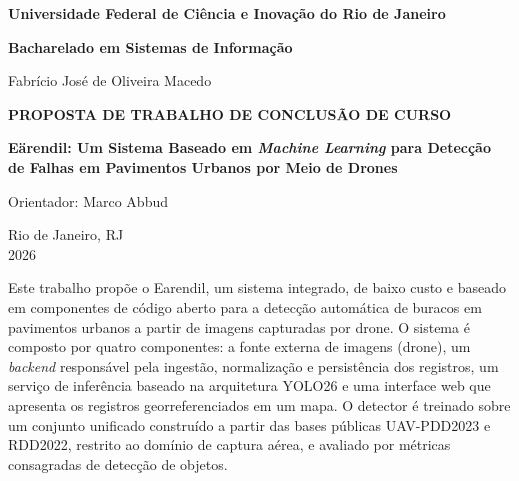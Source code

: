 \documentclass[12pt]{article}
\title{\titulotrabalho}
\author{Fabrício José\inst{1}}
\newcommand{\titulotrabalho}{Eärendil: Um Sistema Baseado em
\emph{Machine Learning} para Detecção de Falhas em Pavimentos Urbanos por
Meio de Drones}
\begin{document}
\begin{titlepage}
  \centering
  \vspace*{0.5cm}
  {\large\bfseries Universidade Federal de Ciência e Inovação do Rio de
    Janeiro\par}
  \vspace{0.3cm}
  {\large \textbf{Bacharelado em Sistemas de Informação}\par}
  \vfill
  {\large Fabrício José de Oliveira Macedo\par}
  \vfill
  {\large\bfseries PROPOSTA DE TRABALHO DE CONCLUSÃO DE CURSO\par}
  \vspace{1.2cm}
  {\Large\bfseries \titulotrabalho\par}
  \vfill
  \hfill\begin{minipage}{0.45\textwidth}
    \raggedright
    Orientador: Marco Abbud %
  \end{minipage}
  \vfill
  {\large Rio de Janeiro, RJ\\ 2026\par}
\end{titlepage}

\setcounter{page}{2}
\tableofcontents
\clearpage

\maketitle




\begin{resumo}

  Este trabalho propõe o Earendil, um sistema integrado, de baixo custo e
  baseado em componentes de código aberto para a detecção automática de
  buracos em pavimentos urbanos a partir de imagens capturadas por drone.
  O sistema é composto por quatro componentes: a fonte externa de imagens
  (drone), um \emph{backend} responsável pela ingestão, normalização e
  persistência dos registros, um serviço de inferência baseado na
  arquitetura YOLO26 e uma interface web que apresenta os registros
  georreferenciados em um mapa. O detector é treinado sobre um conjunto
  unificado construído a partir das bases públicas UAV-PDD2023 e
  RDD2022, restrito ao domínio de captura aérea, e avaliado por métricas
  consagradas de detecção de objetos.
\end{resumo}
\end{document}
